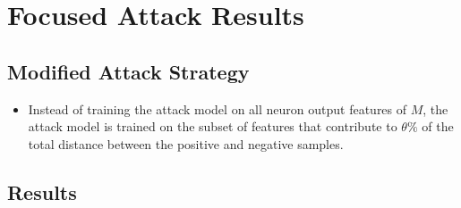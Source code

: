 \documentclass{article}
\begin{document}
\section{Focused Attack Results}
\subsection*{Modified Attack Strategy}
\begin{itemize}
    \item Instead of training the attack model on all neuron output features of $M$, the attack model is trained on the subset of features that contribute to $\theta\%$ of the total distance between the positive and negative samples.
\end{itemize}

\subsection*{Results}
\end{document}
